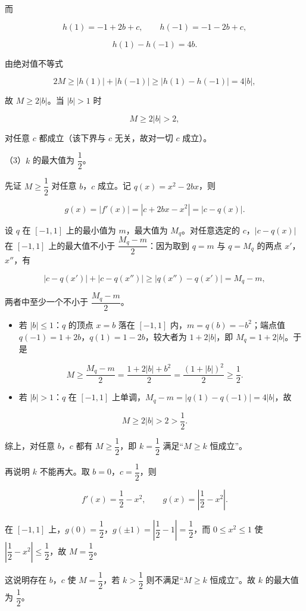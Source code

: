 \begin{answer}
而

\nopagebreak[4]
\[h(1)=-1+2b+c,\qquad h(-1)=-1-2b+c,\]

\nopagebreak[4]
\[h(1)-h(-1)=4b.\]

由绝对值不等式

\nopagebreak[4]
\[2M\geqslant|h(1)|+|h(-1)|\geqslant|h(1)-h(-1)|=4|b|,\]

故 $M\geqslant2|b|$。当 $|b|>1$ 时

\nopagebreak[4]
\[M\geqslant2|b|>2,\]

对任意 $c$ 都成立（该下界与 $c$ 无关，故对一切 $c$ 成立）。

（3）$k$ 的最大值为 $\dfrac12$。

先证 $M\geqslant\dfrac12$ 对任意 $b$，$c$ 成立。记 $q(x)=x^2-2bx$，则

\nopagebreak[4]
\[g(x)=|f'(x)|=|c+2bx-x^2|=|c-q(x)|.\]

设 $q$ 在 $[-1,1]$ 上的最小值为 $m$，最大值为 $M_q$。对任意选定的 $c$，$|c-q(x)|$ 在 $[-1,1]$ 上的最大值不小于 $\dfrac{M_q-m}{2}$：因为取到 $q=m$ 与 $q=M_q$ 的两点 $x'$，$x''$，有

\nopagebreak[4]
\[|c-q(x')|+|c-q(x'')|\geqslant|q(x'')-q(x')|=M_q-m,\]

两者中至少一个不小于 $\dfrac{M_q-m}{2}$。

\begin{itemize}
\item 若 $|b|\leqslant1$：$q$ 的顶点 $x=b$ 落在 $[-1,1]$ 内，$m=q(b)=-b^2$；端点值 $q(-1)=1+2b$，$q(1)=1-2b$，较大者为 $1+2|b|$，即 $M_q=1+2|b|$。于是
\end{itemize}

\nopagebreak[4]
\[M\geqslant\frac{M_q-m}{2}=\frac{1+2|b|+b^2}{2}=\frac{(1+|b|)^2}{2}\geqslant\frac12.\]

\begin{itemize}
\item 若 $|b|>1$：$q$ 在 $[-1,1]$ 上单调，$M_q-m=|q(1)-q(-1)|=4|b|$，故
\end{itemize}

\nopagebreak[4]
\[M\geqslant2|b|>2>\frac12.\]

综上，对任意 $b$，$c$ 都有 $M\geqslant\dfrac12$，即 $k=\dfrac12$ 满足“$M\geqslant k$ 恒成立”。

再说明 $k$ 不能再大。取 $b=0$，$c=\dfrac12$，则

\nopagebreak[4]
\[f'(x)=\frac12-x^2,\qquad g(x)=\left|\frac12-x^2\right|.\]

在 $[-1,1]$ 上，$g(0)=\dfrac12$，$g(\pm1)=\left|\dfrac12-1\right|=\dfrac12$，而 $0\leqslant x^2\leqslant1$ 使 $\left|\dfrac12-x^2\right|\leqslant\dfrac12$，故 $M=\dfrac12$。

这说明存在 $b$，$c$ 使 $M=\dfrac12$，若 $k>\dfrac12$ 则不满足“$M\geqslant k$ 恒成立”。故 $k$ 的最大值为 $\dfrac12$。


\end{answer}